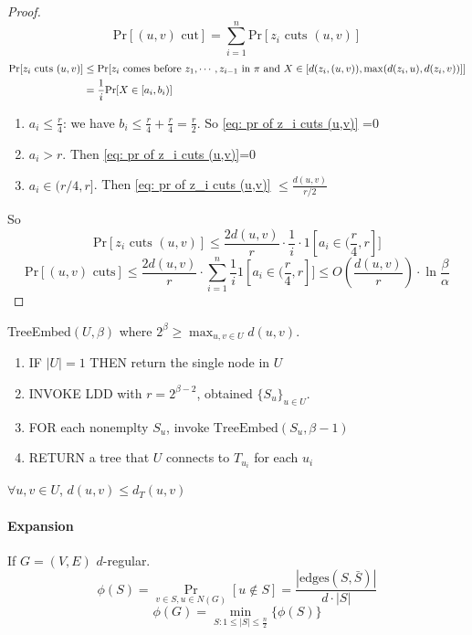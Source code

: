 \begin{proof}
    \[\mathrm{Pr}[(u,v)\text{ cut}]=\sum_{i=1}^n\mathrm{Pr}[z_i\text{ cuts }(u,v)]\]
    \begin{align}
        \mathrm{Pr}[z_i\text{ cuts }(u,v)]& \leq \mathrm{Pr}[z_i\text{ comes before }z_1,\cdots,z_{i-1} \text{ in }\pi\text{ and }X\in[d(z_i,(u,v)),\max(d(z_i,u),d(z_i,v))]]\notag\\
        &=\frac{1}{i}\mathrm{Pr}[X\in [a_i,b_i)]\label{eq: pr of  z_i cuts (u,v)}
    \end{align}
    \begin{enumerate}
        \item  $ a_i \leq \frac{r}{4} $: we have   $ b_i \leq \frac{r}{4}+\frac{r}{4}=\frac{r}{2} $. So \eqref{eq: pr of z_i cuts (u,v)} =0
        \item  $ a_i>r $. Then \eqref{eq: pr of z_i cuts (u,v)}=0
        \item  $ a_i\in (r/4,r] $. Then \eqref{eq: pr of z_i cuts (u,v)} $  \leq \frac{d(u,v)}{r/2} $   
    \end{enumerate}
    So 
    \[\mathrm{Pr}[z_i\text{ cuts }(u,v)] \leq \frac{2d(u,v)}{r}\cdot\frac{1}{i}\cdot 1[a_i\in (\frac{r}{4},r]]\]
    \[\mathrm{Pr}[(u,v)\text{ cuts}] \leq \frac{2d(u,v)}{r}\cdot\sum_{i=1}^n\frac{1}{i}1[a_i\in (\frac{r}{4},r]] \leq O(\frac{d(u,v)}{r})\cdot\ln \frac{\beta}{\alpha}\]
\end{proof}

TreeEmbed$ (U,\beta) $ where  $ 2^\beta \geq \max_{u,v\in U}d(u,v) $.
\begin{enumerate}
    \item IF  $ |U|=1 $ THEN return the single node in  $ U $
    \item INVOKE LDD with  $ r=2^{\beta-2} $, obtained  $ \{S_u\}_{u\in U} $.
    \item FOR each nonemplty  $ S_u $, invoke  $ \mathrm{TreeEmbed}(S_u,\beta-1) $ 
    \item RETURN a tree that  $ U $ connects to  $ T_{u_i} $ for each  $ u_i $   
\end{enumerate}  
\begin{claim}
     $ \forall u,v\in U $,  $ d(u,v) \leq d_T(u,v) $ 
\end{claim}
\paragraph{Expansion} If  $ G=(V,E) $  $ d$-regular.
\[\phi(S)=\mathop\mathrm{Pr}_{v\in S,u\in N(G)}[u\not\in S]=\frac{|\text{edges}(S,\bar{S})|}{d\cdot|S|}\]
\[\phi(G)=\min_{S:1 \leq |S| \leq \frac{n}{2}}\{\phi(S)\}\]
